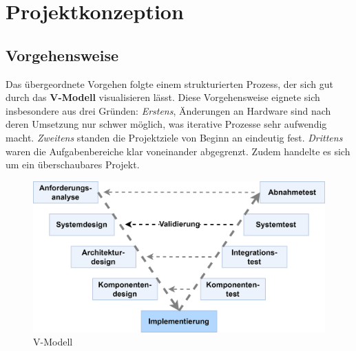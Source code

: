\documentclass[a4paper, portrait, 12pt]{scrartcl} %
\begin{document}
\pagebreak

\section{Projektkonzeption}
\subsection{Vorgehensweise}
Das übergeordnete Vorgehen folgte einem strukturierten Prozess, der sich gut durch das \textbf{V-Modell} visualisieren lässt. Diese Vorgehensweise eignete sich insbesondere aus drei Gründen: \emph{Erstens}, Änderungen an Hardware sind nach deren Umsetzung nur schwer möglich, was iterative Prozesse sehr aufwendig macht. \emph{Zweitens} standen die Projektziele von Beginn an eindeutig fest. \emph{Drittens} waren die Aufgabenbereiche klar voneinander abgegrenzt. Zudem handelte es sich um ein überschaubares Projekt.

\begin{figure}[H]
\centering
    \includegraphics[scale=0.14]{V_Modell.png} 
	\caption{V-Modell}
\end{figure}
\end{document}
